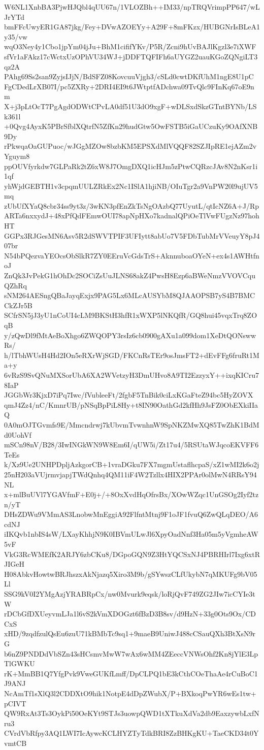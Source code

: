 W6NL1XnbBA3PjwHJQbl4qUU67n/1VLOZBh++IM33/npTRQVrimpPP647/wLJrYTd
bmFFcUwyER1GA87jkg/Fey+DVwAZOEYy+A29F+8mFKzx/HUBGNrIsBLeA1y35/vw
wqO3Ney4y1Cbo1jpYm04jJu+BhM1cififYKv/P5R/Zcni9hUvBAJlKgzl3e7iXWF
sfVr1aFAkz17cWctxUzOPhVU34WJ+jDDFTQFIFh6aUYGZ2uauKGoZQNgiLT3qz2A
PAhg69Ss2san9ZyjsIJjN/BdSFZ08KovcuuVjgh3/cSLd0cwtDKfUhM1ngE8U1pC
FgCDedLrXB07I/pc5ZXRy+2DRI4EI9t6JWtptfADchwa09TvQlc9FInKq67oE9nm
X+j3pLtOcT7PgAgdODWtCPvLA0df51U3dO9xgF+wDLSxdSkzGTntBYNb/LSk361l
+0Qvg4AyxK5PBrSfblXQtrfN5ZfKn29hudGtw5OwFSTB5iGaUCzuKy9OAfXNB9Dy
rPkwqaOaGUPuoc/wJGgMZOw8bzbKM5EPSXdMlVQQF82SZJIpRE1ejAZm2vYguym8
ppOUVfyrkdw7GLPaRk2tZ6xW8J7OmgDXQ1icHJm5zPtwCQRzcJAv8N2nKsr1i1qf
yhWjdGEBTH1v3cpqmUULZRkEx2Nc1ISlA1hjiNB/OIuTgr2a9VnPW20l9ujUV5mq
zUbUfXYaQ8cbr34ss9yt3z/3wKN3pfEnZkTsNgOAzbQ77UyutL/qtIcNZ6A+J/Rp
ARTa6nxxydJ+48xPfQdFEmwOUI78apNpHXo7kadnalQPiOeTlVwFUgzNz97hohHT
GGPx3RJGesMN6Asv5R2dSWVTPIF3UFIytt8abUo7V5FDbTubMrVVeuyY8pJ407br
N54bPQezvaYEOcsObSlkR7ZY0EEruVcGdsTrS+AknnuboaOYeN+ex4s1AWHtfnoJ
ZnQk3JvPekG1hOhDc2SOCiZsUuJLNS68akZ4PwsH8Ezp6aBWeNmzVVOVCquQZhRq
sNM264AESngQBaJayqExjx9PAG5Lx6MLcAUSYbM8QJAAOPSB7yS4B7BMCCkZJr5B
SCfrSN5jJ3yU1nCoUI4cLM9BKStH3hfR1xWXP5lNKQfR/GQ8hui45vqxTrq8ZOqB
y/zQwDl9fMtAeBoXhgo6ZWQOPY3rsIz6cb0900gAXu1a099dom1XeDtQONswwRs/
h/lTbhWUsH4Hd2IOn5eRXrWjSGD/FKCnRsTEr9osJmsFT2+dEvFFg6fruRt1Ma+y
6vRzS9SvQNuMXSorUbA6XA2WVetzyH3DmUHvo8A9TI2EzzyxY++ixqKICru78IaP
JGGbWr3KjxD7iPq7Iwc/fVubleeFt/2fgbF5TnBik0ciLxKGaFteZ94bc5HyZOVX
qmJ4Zz4/nC/KmnrUB/pNSqBpPiL8Hy+t8IN90OathGd2kfHh9JsFZ0ObEXkiIIaQ
0A0mOJTGvmfs9E/Mmcndrwj7kUbvmTvwnhnW9SpNKZMwXQ85TwZhK1BdMd0UohVf
mSCn98nV/B28/3IwINGkWN9W8Em6I/qUW5i/Zt17u4/5RSUtaWJqcoEKVFF6TeEs
k/Xz9Ue2UNHPDpljAzkgorCB+1vraDGku7FX7mgmUstaflhcpaS/xZ1wMI2k6o2j
25nH203aVUjrmvjapjTWdQnhq4QM11iF4W2Tzllx4HIX2PPAr0olMwN4RRsY94NL
x+mlBuUVl7YGAVfmF+E0j+/+8OxXvdHqOfrsBx/XOwWZqc1UnGSOg2Iyf2tzn/yT
DHsZDWu9VMmAS3LnobwMnEggiA92FlfntMtnj9F1oJF1fvuQ6ZwQLqDEO/A6cdNJ
iIKQvb1nbIS4sW/LXayKhhjN9K0IBVmULwJl6XpyOadNnf3Ha05m5yVgmheAW5vF
VkG3RcWMEfK2ARJY6zbCKu8/DGpoGQN9Z3HtYQCSxNJ4PBRHIrl7Ixg6xtRJIGeH
H08AbkvHowtwBRJhszxAkNjazq5Xiro3M9b/gSYwszCLfUkybN7qMKUFg9bV05Ll
SSG9kV0I2YMgAzjYRABRpCx/nw0Mvurk9eqsk/loRjQvF749ZG2JIw7icCYIe3tW
rDCbGfDXUeyvmLJa1l6vS2kVmXDOGzt6fBzD3B8sv/d9HzN+33g0Ots9Ox/CDCxS
xHD/9zqdfzulQsEu6zuU71kBMbTc9sq1+9maeB9UniwJ488cCSauQXh3BtXsN9rG
b6nZ9PNDDdVbSZn43sHCsmvMwW7wAx6wMM4ZEeccVNWsOhf2Kn8jYlE3LpTlGWKU
rK+MmBB1Q7YfgPvk9VweGUKfLmff/DpCLPQ1bE3kCthCOeThaAe4rCuBoC1J9ANJ
NcAmTf1sXlQ3l2CDDXtO9hik1NotpE4dDpZWubX/P+BXkoqPwYR6wEs1tw+pCIVT
QW9RxAt3Ts3OykPi50OeKYt9STJs3uowpQWD1tXTkuXdVa2db9EaxzywbLxfNru3
CVrdVbRfpy3AQ1LWI7IcAywcKCLHYZTyTdkBRI8ZzBHKgKU+TaeCKD34t0YvmtCB
